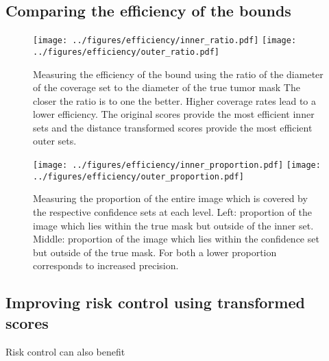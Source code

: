 \subsection{Comparing the efficiency of the bounds}
\begin{figure}
	\begin{center}
			\texttt{[image: ../figures/efficiency/inner\_ratio.pdf]}
		\texttt{[image: ../figures/efficiency/outer\_ratio.pdf]}
	\end{center}
	\caption{Measuring the efficiency of the bound using the ratio of the diameter of the coverage set to the diameter of the true tumor mask The closer the ratio is to one the better. Higher coverage rates lead to a lower efficiency. The original scores provide the most efficient inner sets and the distance transformed scores provide the most efficient outer sets.}\label{fig:efficiency}
\end{figure}
\begin{figure}
	\begin{center}
			\texttt{[image: ../figures/efficiency/inner\_proportion.pdf]}
		\texttt{[image: ../figures/efficiency/outer\_proportion.pdf]}
	\end{center}
	\caption{Measuring the proportion of the entire image which is covered by the respective confidence sets at each level. Left: proportion of the image which lies within the true mask but outside of the inner set. Middle: proportion of the image which lies within the confidence set but outside of the true mask. For both a lower proportion corresponds to increased precision. }\label{fig:efficiency2}
\end{figure}

\subsection{Improving risk control using transformed scores}
Risk control can also benefit  
 


